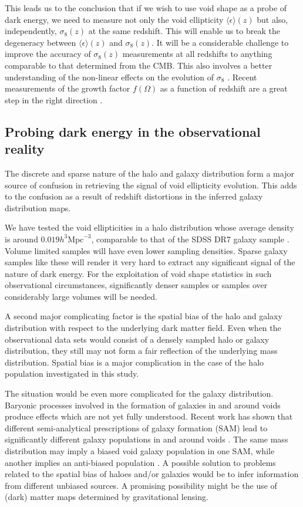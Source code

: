 This leads us to the conclusion that if we wish to use void shape as a probe of dark energy, we need to measure 
not only the void ellipticity $\langle\epsilon\rangle(z)$ but also, independently, $\sigma_8(z)$ at the same redshift. 
This will enable us to break the degeneracy between $\langle\epsilon\rangle(z)$ and $\sigma_8(z)$.
It will be a considerable challenge to improve the accuracy of $\sigma_8(z)$ measurements at all redshifts to anything 
comparable to that determined from the CMB. This also involves a better understanding of the non-linear effects on 
the evolution of $\sigma_8$ \citep{juszkiewicz10a}. Recent measurements of the growth factor $f(\Omega)$ as a function 
of redshift are a great step in the right direction \citep[e.g.][]{blake11, nusser12, tojeiro12, blake12}.

\subsection{Probing dark energy in the observational reality}
The discrete and sparse nature of the halo and galaxy distribution form a major source of confusion in 
retrieving the signal of void ellipticity evolution. This adds to the confusion as a result of redshift 
distortions in the inferred galaxy distribution maps. 

We have tested the void ellipticities in a halo distribution whose average density is around $0.019 h^3 \mathrm{Mpc}^{-3}$, 
comparable to that of the SDSS DR7 galaxy sample \citep{montero09}. Volume limited samples will have even lower sampling 
densities. Sparse galaxy samples like these will render it very hard to extract any significant signal of the nature 
of dark energy. For the exploitation of void shape statistics in such observational circumstances, significantly denser 
samples or samples over considerably large volumes will be needed. 

A second major complicating factor is the spatial bias of the halo and galaxy distribution with respect to the 
underlying dark matter field. Even when the observational data sets would consist of a densely sampled halo or 
galaxy distribution, they still may not form a fair reflection of the underlying mass distribution. 
Spatial bias is a major complication in the case of the halo population investigated in this study. 

The situation would be even more complicated for the galaxy distribution. Baryonic processes involved in the formation of galaxies 
in and around voids produce effects which are not yet fully understood. Recent work has shown that different semi-analytical 
prescriptions of galaxy formation (SAM) lead to significantly different galaxy populations in and around voids \citep{delucia06, bower06}. 
The same mass distribution may imply a biased void galaxy population in one SAM, while another implies an anti-biased population 
\citep{platenphd, platen12}. A possible solution to problems 
related to the spatial bias of haloes and/or galaxies would be to infer information from different unbiased sources. A 
promising possibility might be the use of (dark) matter maps determined by gravitational lensing. 

